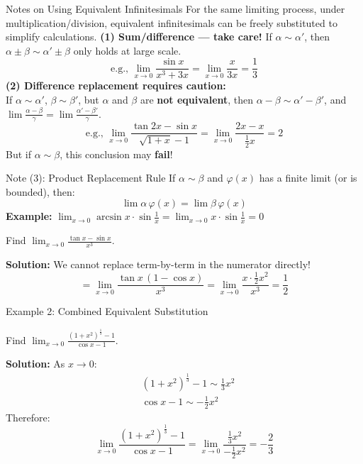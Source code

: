 \documentclass[UTF8,10pt]{beamer}
\begin{document}
\begin{frame}{Notes on Using Equivalent Infinitesimals}
For the same limiting process, under multiplication/division, equivalent infinitesimals can be freely substituted to simplify calculations.
\pause
\vspace{0.5em}
\textbf{(1) Sum/difference --- take care!}
If $\alpha \sim \alpha'$, then $\alpha \pm \beta \sim \alpha' \pm \beta$ only holds at large scale.
\[
\text{e.g., } \lim_{x\to 0} \frac{\sin x}{x^3+3x} = \lim_{x\to 0} \frac{x}{3x} = \frac{1}{3}
\]
\pause
\vspace{0.3em}
\textbf{(2) Difference replacement requires caution:}\\
If $\alpha \sim \alpha'$, $\beta \sim \beta'$, but $\alpha$ and $\beta$ are \textbf{not equivalent},
then $\alpha - \beta \sim \alpha' - \beta'$, and $\displaystyle \lim\frac{\alpha-\beta}{\gamma} = \lim\frac{\alpha'-\beta'}{\gamma}$.
\pause
\[
\text{e.g., } \lim_{x\to 0} \frac{\tan 2x - \sin x}{\sqrt{1+x}-1} = \lim_{x\to 0} \frac{2x-x}{\frac{1}{2}x} = 2
\]
\pause
\small But if $\alpha \sim \beta$, this conclusion may \textbf{fail}!
\end{frame}

\begin{frame}{Note (3): Product Replacement Rule}
If $\alpha \sim \beta$ and $\varphi(x)$ has a finite limit (or is bounded), then:
\[
\lim \alpha\,\varphi(x) = \lim \beta\,\varphi(x)
\]
\pause
\textbf{Example:} $\displaystyle \lim_{x\to 0} \arcsin x \cdot \sin\frac{1}{x} = \lim_{x\to 0} x \cdot \sin\frac{1}{x} = 0$
\pause
\vspace{0.5em}
\begin{example}
Find $\displaystyle \lim_{x\to 0} \frac{\tan x - \sin x}{x^3}$.
\end{example}
\pause
\textbf{Solution:} We cannot replace term-by-term in the numerator directly!
\[
= \lim_{x\to 0} \frac{\tan x\,(1-\cos x)}{x^3} = \lim_{x\to 0} \frac{x \cdot \frac{1}{2}x^2}{x^3} = \frac{1}{2}
\]
\end{frame}

\begin{frame}{Example 2: Combined Equivalent Substitution}
\begin{example}
Find $\displaystyle \lim_{x\to 0} \frac{(1+x^2)^{\frac{1}{3}}-1}{\cos x - 1}$.
\end{example}
\pause
\textbf{Solution:} As $x \to 0$:
\pause
\begin{align*}
&(1+x^2)^{\frac{1}{3}} - 1 \sim \frac{1}{3}x^2 \\
&\cos x - 1 \sim -\frac{1}{2}x^2
\end{align*}
\pause
Therefore:
\[
\boxed{\lim_{x\to 0} \frac{(1+x^2)^{\frac{1}{3}}-1}{\cos x - 1} = \lim_{x\to 0} \frac{\frac{1}{3}x^2}{-\frac{1}{2}x^2} = -\frac{2}{3}}
\]
\end{frame}
\end{document}
